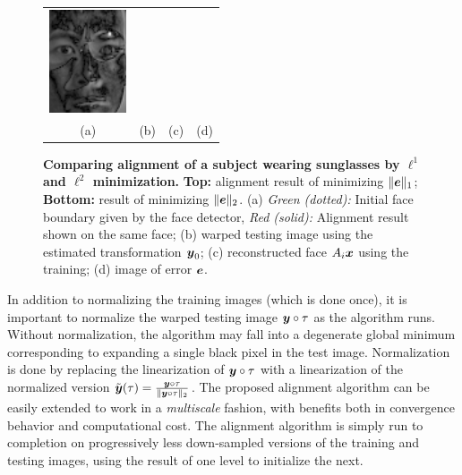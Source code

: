 \begin{figure}
\begin{tabular}{cccc}
\includegraphics[height=1.2in]{figures_cvpr/e_L2} \\
(a) & (b) & (c) & (d)
\end{tabular}
\caption{{\bf Comparing alignment of a subject wearing sunglasses by 
$\ell^1$ and $\ell^2$ minimization.} 
{\bf Top:} alignment result of minimizing $\|\boldsymbol{e}\|_1$; {\bf Bottom:} 
result of minimizing $\|\boldsymbol{e}\|_2$. (a) {\em Green (dotted):} Initial face boundary
given by the face detector, {\em Red (solid):} Alignment result shown on the same
face; (b) warped testing image using the estimated transformation ${\boldsymbol{y}}_0$; 
(c) reconstructed face $A_i{\boldsymbol{x}}$ using the training; (d) image of error $\boldsymbol{e}$. \vspace{0mm}}\label{fig:L1-L2-align}
\vspace{0mm}\end{figure}

In addition to normalizing the training images (which is done once), it is important to normalize the warped testing image ${\boldsymbol{y}} \circ \tau$ as the algorithm runs.  Without normalization, the algorithm may fall into a degenerate global minimum corresponding to expanding a single black pixel in the test image.  Normalization is done by replacing the linearization of ${\boldsymbol{y}} \circ \tau$ with a linearization of the normalized version $\tilde {{\boldsymbol{y}}}(\tau) = \frac{{\boldsymbol{y}} \circ \tau}{\|{\boldsymbol{y}} \circ \tau\|_2}$.  The proposed alignment algorithm can be easily extended to work in a {\em multiscale} fashion, with benefits both in convergence behavior and computational cost.  The alignment algorithm is simply run to completion on progressively less down-sampled versions of the training and testing images, using the result of one level to initialize the next.  \vspace{0mm}

